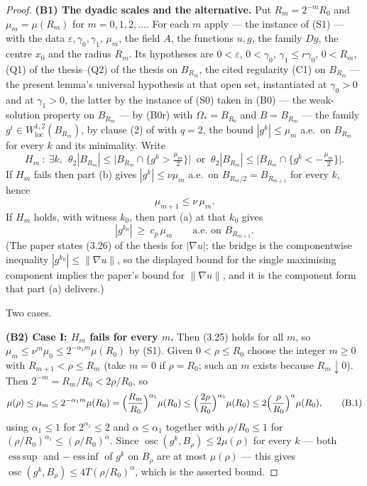\begin{proof}
\textbf{(B1) The dyadic scales and the alternative.}  Put $R_m=2^{-m}R_0$ and
$\mu_m=\mu(R_m)$ for $m=0,1,2,\dots$.  For each $m$ apply
 --- the instance of (S1) --- with the data
$\varepsilon,\gamma_0,\gamma_1$, $\mu_m$, the field $A$, the functions $u,g$,
the family $Dg$, the centre $x_0$ and the radius $R_m$.  Its hypotheses are
$0<\varepsilon$, $0<\gamma_0$, $\gamma_1\le r\gamma_0$, $0<R_m$,
(Q1) of the thesis--(Q2) of the thesis on $B_{R_m}$, the cited regularity (C1) on
$B_{R_m}$ --- the present lemma's universal hypothesis at that open set,
instantiated at $\gamma_0>0$ and at $\gamma_1>0$, the latter by the instance of
(S0) taken in (B0) ---
the weak-solution property on $B_{R_m}$ --- by (B0r) with
$\Omega_\ast=B_{R_0}$ and $B=B_{R_m}$ --- the family
$g^i\in W^{1,2}_{\mathrm{loc}}(B_{R_m})$, by clause (2) of
 with $q=2$, the bound $|g^k|\le\mu_m$ a.e.\ on
$B_{R_m}$ for every $k$ and its minimality.  Write
\[
H_m\ :\ \exists k,\ \ \theta_2|B_{R_m}|\le\bigl|B_{R_m}\cap\{g^k>\tfrac{\mu_m}2\}\bigr|
\ \text{ or }\ \theta_2|B_{R_m}|\le\bigl|B_{R_m}\cap\{g^k<-\tfrac{\mu_m}2\}\bigr| .
\]
If $H_m$ fails then part (b) gives $|g^k|\le\nu\mu_m$ a.e.\ on $B_{R_m/2}
=B_{R_{m+1}}$ for every $k$, hence
\[
\mu_{m+1}\le\nu\,\mu_m .
\tag{3.25}
\]
If $H_m$ holds, with witness $k_0$, then part (a) at that $k_0$ gives
\[
|g^{k_0}|\ \ge\ c_p\,\mu_m\qquad\text{a.e.\ on }B_{R_{m+1}} .
\tag{3.26}
\]
(The paper states (3.26) of the thesis for $|\nabla u|$; the bridge is the
componentwise inequality $|g^{k_0}|\le\|\nabla u\|$, so the displayed bound for
the single maximising component implies the paper's bound for $\|\nabla u\|$,
and it is the component form that part (a) delivers.)

Two cases.

\textbf{(B2) Case I: $H_m$ fails for every $m$.}  Then (3.25) holds for all $m$,
so $\mu_m\le\nu^m\mu_0\le2^{-\alpha_1m}\mu(R_0)$ by (S1).  Given
$0<\rho\le R_0$ choose the integer $m\ge0$ with $R_{m+1}<\rho\le R_m$ (take
$m=0$ if $\rho=R_0$; such an $m$ exists because $R_m\downarrow0$).  Then
$2^{-m}=R_m/R_0<2\rho/R_0$, so
\[
\mu(\rho)\le\mu_m\le2^{-\alpha_1m}\mu(R_0)
=\Bigl(\frac{R_m}{R_0}\Bigr)^{\alpha_1}\mu(R_0)
\le\Bigl(\frac{2\rho}{R_0}\Bigr)^{\alpha_1}\mu(R_0)
\le2\Bigl(\frac{\rho}{R_0}\Bigr)^{\alpha}\mu(R_0),
\tag{B.1}
\]
using $\alpha_1\le1$ for $2^{\alpha_1}\le2$ and $\alpha\le\alpha_1$ together
with $\rho/R_0\le1$ for $(\rho/R_0)^{\alpha_1}\le(\rho/R_0)^{\alpha}$.  Since
$\operatorname*{osc}(g^k,B_\rho)\le2\mu(\rho)$ for every $k$ --- both
$\operatorname{ess\,sup}$ and $-\operatorname{ess\,inf}$ of $g^k$ on $B_\rho$
are at most $\mu(\rho)$ --- this gives
$\operatorname*{osc}(g^k,B_\rho)\le4T(\rho/R_0)^{\alpha}$, which is
the asserted bound.


\end{proof}
